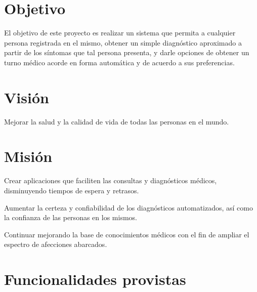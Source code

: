 \documentclass[a4paper,10pt]{article}
\begin{document}
%
%

\setcounter{page}{1}

%
%

\newpage
\tableofcontents

\newpage
\section{Objetivo}

El objetivo de este proyecto es realizar un sistema que permita a cualquier persona registrada en el mismo, obtener 
un simple diagnóstico aproximado a partir de los síntomas que tal persona presenta, y darle opciones de obtener un turno médico acorde en forma automática y de acuerdo a sus preferencias.

\section{Visión}

Mejorar la salud y la calidad de vida de todas las personas en el mundo.

\section{Misión}

Crear aplicaciones que faciliten las consultas y diagnósticos médicos, disminuyendo tiempos de espera y retrasos.  

Aumentar la certeza y confiabilidad de los diagnósticos automatizados, así como la confianza de las personas en los mismos. 

Continuar mejorando la base de conocimientos médicos con el fin de ampliar el espectro de afecciones abarcados. 

\section{Funcionalidades provistas}
\end{document}
